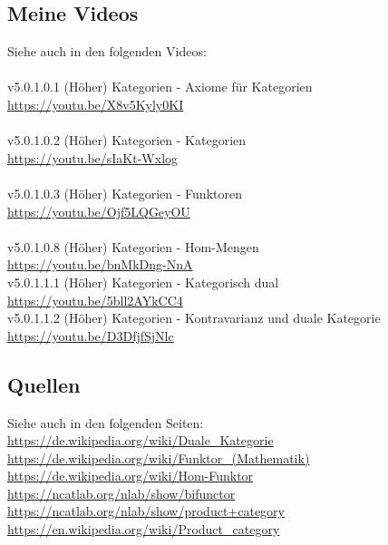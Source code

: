 \documentclass[a4paper]{amsart}
\theoremstyle{definition}
\begin{document}
\subsection*{Meine Videos}
Siehe auch in den folgenden Videos:\\
\\
v5.0.1.0.1 (Höher) Kategorien - Axiome für Kategorien\\
\url{https://youtu.be/X8v5Kyly0KI}\\
\\
v5.0.1.0.2 (Höher) Kategorien - Kategorien\\
\url{https://youtu.be/sIaKt-Wxlog}\\
\\
v5.0.1.0.3 (Höher) Kategorien - Funktoren\\
\url{https://youtu.be/Ojf5LQGeyOU}\\
\\
v5.0.1.0.8 (Höher) Kategorien - Hom-Mengen\\
\url{https://youtu.be/bnMkDng-NnA}
\\
v5.0.1.1.1 (Höher) Kategorien - Kategorisch dual\\
\url{https://youtu.be/5bll2AYkCC4}
\\
v5.0.1.1.2 (Höher) Kategorien - Kontravarianz und duale Kategorie\\
\url{https://youtu.be/D3DfjfSjNlc}

\subsection*{Quellen}
Siehe auch in den folgenden Seiten:\\
\url{https://de.wikipedia.org/wiki/Duale_Kategorie}\\
\url{https://de.wikipedia.org/wiki/Funktor_(Mathematik)}\\
\url{https://de.wikipedia.org/wiki/Hom-Funktor}\\
\url{https://ncatlab.org/nlab/show/bifunctor}\\
\url{https://ncatlab.org/nlab/show/product+category}\\
\url{https://en.wikipedia.org/wiki/Product_category}

\end{document}
